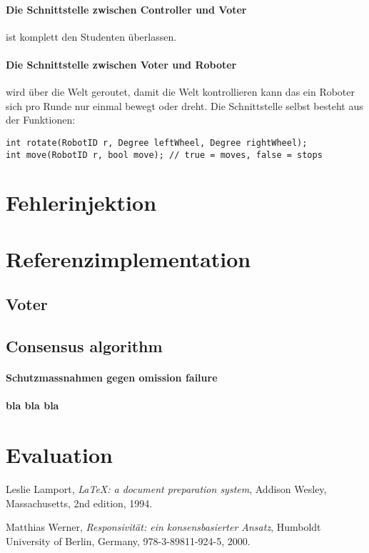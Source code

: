 \documentclass[
    12pt,
    bibliography=totoc,
    ngerman
]{scrartcl}
\begin{document}
\paragraph{Die Schnittstelle zwischen Controller und Voter} ist komplett den Studenten {\"{u}}berlassen.

\paragraph{Die Schnittstelle zwischen Voter und Roboter} wird {\"{u}}ber die Welt geroutet, damit die Welt kontrollieren kann das ein
Roboter sich pro Runde nur einmal bewegt oder dreht. Die Schnittstelle selbst besteht aus der Funktionen:
\begin{lstlisting}
int rotate(RobotID r, Degree leftWheel, Degree rightWheel);
int move(RobotID r, bool move); // true = moves, false = stops
\end{lstlisting}


\clearpage
\section{Fehlerinjektion}

\clearpage
\section{Referenzimplementation}
\subsection{Voter}
\subsection{Consensus algorithm}
\paragraph{Schutzmassnahmen gegen omission failure}
\paragraph{bla bla bla}


\clearpage
\section{Evaluation}


\clearpage
\begin{thebibliography}{9}

  Leslie Lamport,
  \emph{\LaTeX: a document preparation system},
  Addison Wesley, Massachusetts,
  2nd edition,
  1994.
  
  Matthias Werner,
  \emph{Responsivit{\"{a}}t: ein konsensbasierter Ansatz},
  Humboldt University of Berlin, Germany,
  978-3-89811-924-5,
  2000.
   
\end{thebibliography}
\end{document}

